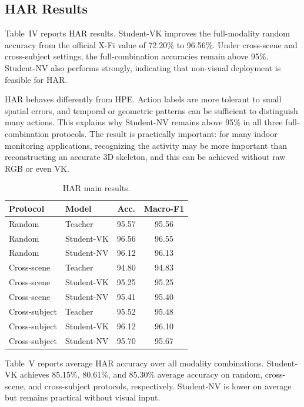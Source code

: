 \documentclass[journal, twocolumn, transmag]{IEEEtran}
\newcommand{\xfi}{X-Fi}
\newcommand{\smalltab}{\scriptsize}
\begin{document}
\subsection{HAR Results}
Table~IV reports HAR results. Student-VK improves the full-modality random accuracy from the official \xfi{} value of 72.20\% to 96.56\%. Under cross-scene and cross-subject settings, the full-combination accuracies remain above 95\%. Student-NV also performs strongly, indicating that non-visual deployment is feasible for HAR.

HAR behaves differently from HPE. Action labels are more tolerant to small spatial errors, and temporal or geometric patterns can be sufficient to distinguish many actions. This explains why Student-NV remains above 95\% in all three full-combination protocols. The result is practically important: for many indoor monitoring applications, recognizing the activity may be more important than reconstructing an accurate 3D skeleton, and this can be achieved without raw RGB or even VK.

\begin{table}[t]
	\caption{HAR main results.}
	\label{tab:har-main}
	\centering
	\smalltab
	\begin{tabular}{llcc}
		\toprule
		Protocol & Model & Acc. & Macro-F1\\
		\midrule
		Random & Teacher & 95.57 & 95.56\\
		Random & Student-VK & 96.56 & 96.55\\
		Random & Student-NV & 96.12 & 96.13\\
		Cross-scene & Teacher & 94.80 & 94.83\\
		Cross-scene & Student-VK & 95.25 & 95.25\\
		Cross-scene & Student-NV & 95.41 & 95.40\\
		Cross-subject & Teacher & 95.52 & 95.48\\
		Cross-subject & Student-VK & 96.12 & 96.10\\
		Cross-subject & Student-NV & 95.70 & 95.67\\
		\bottomrule
	\end{tabular}
\end{table}

Table~V reports average HAR accuracy over all modality combinations. Student-VK achieves 85.15\%, 80.61\%, and 85.30\% average accuracy on random, cross-scene, and cross-subject protocols, respectively. Student-NV is lower on average but remains practical without visual input.
\end{document}
